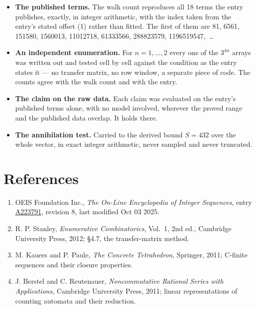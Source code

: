 \documentclass[11pt]{article}
\theoremstyle{definition}
\begin{document}
\begin{itemize}

\item {\bfseries The published terms.} The walk count reproduces all 18 terms the entry publishes, exactly, in integer arithmetic, with the index taken from the entry's stated offset (1) rather than fitted. The first of them are 81, 6561, 151580, 1560013, 11012718, 61333566, 288823579, 1196519547,~\dots

\item {\bfseries An independent enumeration.} For $n = 1,\dots,2$ every one of the $3^{4n}$ arrays was written out and tested cell by cell against the condition as the entry states it --- no transfer matrix, no row window, a separate piece of code. The counts agree with the walk count and with the entry.

\item {\bfseries The claim on the raw data.} Each claim was evaluated on the entry's published terms alone, with no model involved, wherever the proved range and the published data overlap. It holds there.

\item {\bfseries The annihilation test.} Carried to the derived bound $S = 432$ over the whole vector, in exact integer arithmetic, never sampled and never truncated.

\end{itemize}

\section{References}

\begin{enumerate}

\item OEIS Foundation Inc., \emph{The On-Line Encyclopedia of Integer Sequences}, entry \href{https://oeis.org/A223791}{A223791}, revision 8, last modified Oct 03 2025.

\item R. P. Stanley, \emph{Enumerative Combinatorics}, Vol.~1, 2nd ed., Cambridge University Press, 2012; \S4.7, the transfer-matrix method.

\item M. Kauers and P. Paule, \emph{The Concrete Tetrahedron}, Springer, 2011; C-finite sequences and their closure properties.

\item J. Berstel and C. Reutenauer, \emph{Noncommutative Rational Series with Applications}, Cambridge University Press, 2011; linear representations of counting automata and their reduction.

\end{enumerate}
\end{document}
